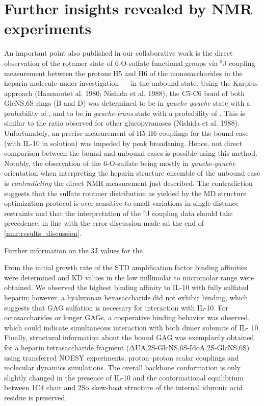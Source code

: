 
\section{Further insights revealed by NMR experiments}
\label{nmr:further_insights}

An important point also published in our collaborative work
\cite{kuenze_gehrcke_2014} is the direct observation of the rotamer state of
6-O-sulfate functional groups via ${}^{3}$J coupling measurement between the
protons H5 and H6 of the monosaccharides in the heparin molecule under
investigation --- in the unbound state. Using the Karplus approach (Haasnootet
al. 1980; Nishida et al. 1988), the C5-C6 bond of both GlcNS,6S rings (B and D)
was determined to be in \textit{gauche-gauche} state with a probability of
, and to be in  \textit{gauche-trans} state with a probability
of . This is similar to the ratio observed for other
glucopyranoses (Nishida et al. 1988). Unfortunately, an precise measurement of
H5-H6 couplings for the bound case (with IL-10 in solution) was impeded by peak
broadening. Hence, not direct comparison between the bound and unbound cases is
possible using this method. Notably, the observation of the 6-O-sulfate being
mostly in \textit{gauche-gauche} orientation when interpreting the heparin
structure ensemble of the unbound case is \textit{contradicting} the direct NMR
measurement just described. The contradiction suggests that the sulfate rotamer
distribution as yielded by the MD structure optimization protocol is
over-sensitive to small variations in single distance restraints and that the
interpretation of the ${}^{3}$J coupling data should take precedence, in line
with the error discussion made ad the end of \cref{nmr:results_discussion}.


Further information
on the  3J values for the



From the
initial growth rate of the STD amplification factor binding
affinities were determined and KD values in the low millimolar
to micromolar range were obtained. We observed the
highest binding affinity to IL-10 with fully sulfated heparin;
however, a hyaluronan hexasaccharide did not exhibit binding,
which suggests that GAG sulfation is necessary for interaction
with IL-10. For octasaccharides or longer GAGs, a
cooperative binding behavior was observed, which could indicate
simultaneous interaction with both dimer subunits of IL-
10. Finally, structural information about the bound GAG was
exemplarily obtained for a heparin tetrasaccharide fragment
(ΔUA,2S-GlcNS,6S-IdoA,2S-GlcNS,6S) using transferred
NOESY experiments, proton–proton scalar couplings and
molecular dynamics simulations. The overall backbone conformation
is only slightly changed in the presence of IL-10
and the conformational equilibrium between 1C4 chair and
2So skew-boat structure of the internal iduronic acid residue
is preserved.







